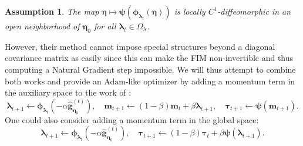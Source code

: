 \documentclass[a4paper, 11pt, oneside]{scrartcl}
\theoremstyle{break}
\newtheorem{assumption}{Assumption}
\newcommand{\matr}[1]{\boldsymbol{#1}}
\numberwithin{equation}{section}
\begin{document}
				\begin{assumption}
					\label{assumption:Diffeomorphism}
					The map $\matr{\eta} \mapsto \matr{\psi} (\matr{\phi}_{\matr{\lambda}_t} (\matr{\eta}))$ is locally $C^1$-diffeomorphic in an open neighborhood of $\matr{\eta}_0$ for all $\matr{\lambda}_t \in \Omega_{\lambda}$.
				\end{assumption}
				However, their method cannot impose special structures beyond a diagonal covariance matrix as easily since this can make the FIM non-invertible and thus computing a Natural Gradient step impossible. 
				We will thus attempt to combine both works and provide an Adam-like optimizer by adding a momentum term in the auxiliary space to the work of \parencite{LNK+21}:
				$$\matr{\lambda}_{t+1} \leftarrow \matr{\phi}_{\matr{\lambda}_t}(-\alpha \matr{\hat{g}}_{\matr{\eta}_0}^{(t)}), \quad \matr{m}_{t+1} \leftarrow (1-\beta) \matr{m}_t + \beta \matr{\lambda}_{t+1}, \quad \matr{\tau}_{t+1} \leftarrow \matr{\psi} (\matr{m}_{t+1}).$$
				One could also consider adding a momentum term in the global space:
				$$\matr{\lambda}_{t+1} \leftarrow \matr{\phi}_{\matr{\lambda}_t}(-\alpha \matr{\hat{g}}_{\matr{\eta}_0}^{(t)}), \quad \matr{\tau}_{t+1} \leftarrow (1-\beta) \matr{\tau}_t + \beta \matr{\psi}(\matr{\lambda}_{t+1}).$$
\end{document}
